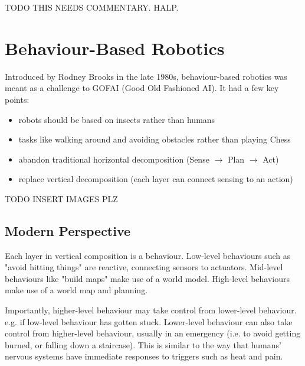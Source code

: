 TODO THIS NEEDS COMMENTARY. HALP.

\section{Behaviour-Based Robotics}
Introduced by Rodney Brooks in the late 1980s, behaviour-based robotics was
meant as a challenge to GOFAI (Good Old Fashioned AI). It had a few key points:
\begin{itemize}
    \item robots should be based on insects rather than humans
    \item tasks like walking around and avoiding obstacles rather than playing
        Chess
    \item abandon traditional horizontal decomposition (Sense $\rightarrow$
        Plan $\rightarrow$ Act)
    \item replace vertical decomposition (each layer can connect sensing to an
        action)
\end{itemize}

TODO INSERT IMAGES PLZ

\subsection{Modern Perspective}
Each layer in vertical composition is a behaviour. Low-level behaviours such as
"avoid hitting things" are reactive, connecting sensors to actuators. Mid-level
behaviours like "build maps" make use of a world model. High-level behaviours
make use of a world map and planning.

Importantly, higher-level behaviour may take control from lower-level
behaviour. e.g. if low-level behaviour has gotten stuck. Lower-level behaviour
can also take control from higher-level behaviour, usually in an emergency
(i.e. to avoid getting burned, or falling down a staircase). This is similar to
the way that humans' nervous systems have immediate responses to triggers such
as heat and pain.
